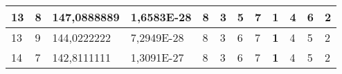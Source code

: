 \documentclass[conference]{IEEEtran}
\begin{document}
\begin{table*}[]
\begin{tabular}{|llll|llllllll|}
\multicolumn{1}{|l|}{13}                                                             & \multicolumn{1}{l|}{8}                                                                 & \multicolumn{1}{l|}{147,0888889}                                                           & 1,6583E-28                              & \multicolumn{1}{l|}{8}                                                           & \multicolumn{1}{l|}{3}                                                           & \multicolumn{1}{l|}{5}                                                           & \multicolumn{1}{l|}{7}                                                           & \multicolumn{1}{l|}{\textbf{1}}                                                  & \multicolumn{1}{l|}{4}                                                           & \multicolumn{1}{l|}{6}                                                           & 2                                   \\ \hline
\multicolumn{1}{|l|}{13}                                                             & \multicolumn{1}{l|}{9}                                                                 & \multicolumn{1}{l|}{144,0222222}                                                           & 7,2949E-28                              & \multicolumn{1}{l|}{8}                                                           & \multicolumn{1}{l|}{3}                                                           & \multicolumn{1}{l|}{6}                                                           & \multicolumn{1}{l|}{7}                                                           & \multicolumn{1}{l|}{\textbf{1}}                                                  & \multicolumn{1}{l|}{4}                                                           & \multicolumn{1}{l|}{5}                                                           & 2                                   \\ \hline
\multicolumn{1}{|l|}{14}                                                             & \multicolumn{1}{l|}{7}                                                                 & \multicolumn{1}{l|}{142,8111111}                                                           & 1,3091E-27                              & \multicolumn{1}{l|}{8}                                                           & \multicolumn{1}{l|}{3}                                                           & \multicolumn{1}{l|}{6}                                                           & \multicolumn{1}{l|}{7}                                                           & \multicolumn{1}{l|}{\textbf{1}}                                                  & \multicolumn{1}{l|}{4}                                                           & \multicolumn{1}{l|}{5}                                                           & 2                                   \\ \hline

\end{tabular}
\end{table*}
\end{document}
